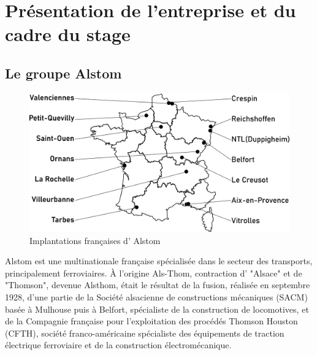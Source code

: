 \documentclass[a4paper]{report}
\begin{document}
	\renewcommand*\contentsname{Sommaire} %
	\tableofcontents
	\pagebreak
	
	
	
	
	
	\renewcommand{\chaptername}{Partie} %
	\chapter{Présentation de l'entreprise et du cadre du stage}
	
	\section{Le groupe Alstom}
	\begin{figure}
		\includegraphics[width=0.9\linewidth]{carte_france} 
		\caption{Implantations françaises d' Alstom}
		\label{fig:carte}
	\end{figure}
	Alstom est une multinationale française spécialisée dans le secteur des transports, principalement ferroviaires.
	À l'origine Als-Thom, contraction d' "Alsace" et de "Thomson", devenue Alsthom, était le résultat de la fusion, réalisée en septembre 1928, d'une partie de la Société alsacienne de constructions mécaniques (SACM) basée à Mulhouse puis à Belfort, spécialiste de la construction de locomotives, et de la Compagnie française pour l'exploitation des procédés Thomson Houston (CFTH), société franco-américaine spécialiste des équipements de traction électrique ferroviaire et de la construction électromécanique.\\
	
\end{document}
